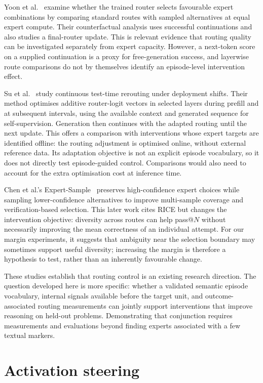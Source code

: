 \documentclass[12pt,a4paper,twoside,openright]{book}
\begin{document}
Yoon et al.~\cite{yoon2026misrouted} examine whether the trained router selects
favourable expert combinations by comparing standard routes with sampled
alternatives at equal expert compute. Their counterfactual analysis uses
successful continuations and also studies a final-router update. This is
relevant evidence that routing quality can be investigated separately from
expert capacity. However, a next-token score on a supplied continuation is a
proxy for free-generation success, and layerwise route comparisons do not
by themselves identify an episode-level intervention effect.

Su et al.~\cite{su2025rewiring} study continuous test-time rerouting under
deployment shifts. Their method optimises additive router-logit vectors
in selected layers during prefill and at subsequent intervals, using the
available context and generated sequence for self-supervision. Generation
then continues with the adapted routing until the next update. This offers
a comparison with interventions whose expert targets are identified offline:
the routing adjustment is optimised online, without external reference data.
Its adaptation objective is not an explicit episode vocabulary, so it does
not directly test episode-guided control. Comparisons would also need to
account for the extra optimisation cost at inference time.

Chen et al.'s Expert-Sample~\cite{chen2026expertsample} preserves
high-confidence expert choices while sampling lower-confidence alternatives
to improve multi-sample coverage and verification-based selection.
This later work cites RICE but changes the intervention objective: diversity
across routes can help pass@$N$ without necessarily improving the mean
correctness of an individual attempt. For our margin experiments, it suggests
that ambiguity near the selection boundary may sometimes support useful
diversity; increasing the margin is therefore a hypothesis to test, rather
than an inherently favourable change.

These studies establish that routing control is an existing research
direction. The question developed here is more specific: whether a validated
semantic episode vocabulary, internal signals available before the target
unit, and outcome-associated routing measurements can jointly support interventions
that improve reasoning on held-out problems. Demonstrating that conjunction
requires measurements and evaluations beyond finding experts associated with
a few textual markers.

\section{Activation steering}
\end{document}
